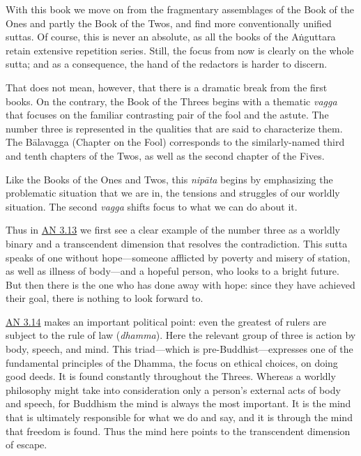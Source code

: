 \documentclass[12pt,openany]{book}%
\begin{document}
With this book we move on from the fragmentary assemblages of the Book of the Ones and partly the Book of the Twos, and find more conventionally unified suttas. Of course, this is never an absolute, as all the books of the \textsanskrit{Aṅguttara} retain extensive repetition series. Still, the focus from now is clearly on the whole sutta; and as a consequence, the hand of the redactors is harder to discern.

That does not mean, however, that there is a dramatic break from the first books. On the contrary, the Book of the Threes begins with a thematic \textit{vagga} that focuses on the familiar contrasting pair of the fool and the astute. The number three is represented in the qualities that are said to characterize them. The \textsanskrit{Bālavagga} (Chapter on the Fool) corresponds to the similarly-named third and tenth chapters of the Twos, as well as the second chapter of the Fives.

Like the Books of the Ones and Twos, this \textit{\textsanskrit{nipāta}} begins by emphasizing the problematic situation that we are in, the tensions and struggles of our worldly situation. The second \textit{vagga} shifts focus to what we can do about it.

Thus in \href{https://suttacentral.net/an3.13}{AN 3.13} we first see a clear example of the number three as a worldly binary and a transcendent dimension that resolves the contradiction. This sutta speaks of one without hope—someone afflicted by poverty and misery of station, as well as illness of body—and a hopeful person, who looks to a bright future. But then there is the one who has done away with hope: since they have achieved their goal, there is nothing to look forward to.

\href{https://suttacentral.net/an3.14}{AN 3.14} makes an important political point: even the greatest of rulers are subject to the rule of law (\textit{dhamma}). Here the relevant group of three is action by body, speech, and mind. This triad—which is pre-Buddhist—expresses one of the fundamental principles of the Dhamma, the focus on ethical choices, on doing good deeds. It is found constantly throughout the Threes. Whereas a worldly philosophy might take into consideration only a person’s external acts of body and speech, for Buddhism the mind is always the most important. It is the mind that is ultimately responsible for what we do and say, and it is through the mind that freedom is found. Thus the mind here points to the transcendent dimension of escape.
\end{document}

